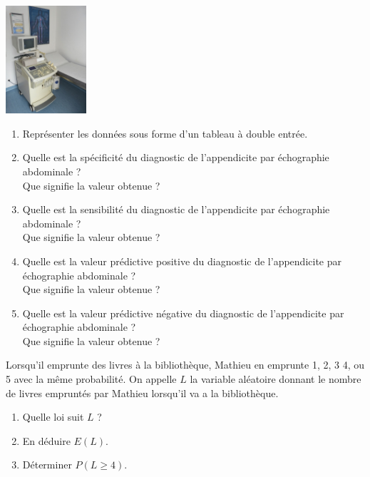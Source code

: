 \documentclass[a4paper,11pt,exos]{nsi} %
\begin{document}
{\includegraphics[width=3cm]{echographie.jpg}}
\begin{enumerate}
    \item Représenter les données sous forme d'un tableau à double entrée.
    \item Quelle est la spécificité du diagnostic de l'appendicite par échographie abdominale ?\\
    Que signifie la valeur obtenue ?
    \item Quelle est la sensibilité du diagnostic de l'appendicite par échographie abdominale ?\\
    Que signifie la valeur obtenue ?
    \item Quelle est la valeur prédictive positive du diagnostic de l'appendicite par échographie abdominale ?\\
    Que signifie la valeur obtenue ?
    \item Quelle est la valeur prédictive négative du diagnostic de l'appendicite par échographie abdominale ?\\
    Que signifie la valeur obtenue ?
\end{enumerate}

\exo{}
Lorsqu'il emprunte des livres à la bibliothèque, Mathieu en emprunte 1, 2, 3 4, ou 5 avec la même probabilité. On appelle $L$ la variable aléatoire donnant le nombre de livres empruntés par Mathieu lorsqu'il va a la bibliothèque.
\begin{enumerate}
    \item Quelle loi suit $L$ ?
    \item En déduire $E(L)$.
    \item Déterminer $P(L\geqslant 4)$.
\end{enumerate}
\end{document}
